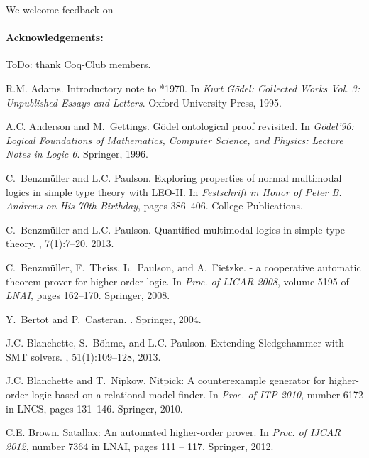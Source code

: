 \documentclass{llncs}
\begin{document}
We welcome feedback on 

\paragraph{Acknowledgements:} ToDo: thank Coq-Club members.


%
\begin{thebibliography}{10}

R.M. Adams.
\newblock Introductory note to *1970.
\newblock In {\em {Kurt G\"odel: Collected Works Vol. 3: Unpublished Essays and
  Letters}}. Oxford University Press, 1995.

A.C. Anderson and M.~Gettings.
\newblock G\"odel ontological proof revisited.
\newblock In {\em {G\"odel'96: Logical Foundations of Mathematics, Computer
  Science, and Physics: Lecture Notes in Logic 6}}. {Springer}, 1996.

C.~Benzm{\"u}ller and L.C. Paulson.
\newblock Exploring properties of normal multimodal logics in simple type
  theory with {LEO-II}.
\newblock In {\em {Festschrift in Honor of {Peter B. Andrews} on His 70th
  Birthday}}, pages 386--406. College Publications.

C.~Benzm{\"u}ller and L.C. Paulson.
\newblock Quantified multimodal logics in simple type theory.
,
  7(1):7--20, 2013.

C.~Benzm{\"u}ller, F.~Theiss, L.~Paulson, and A.~Fietzke.
 - a cooperative automatic theorem prover for higher-order
  logic.
\newblock In {\em Proc. of IJCAR 2008}, volume 5195 of {\em LNAI}, pages
  162--170. Springer, 2008.

Y.~Bertot and P.~Casteran.
.
\newblock Springer, 2004.

J.C. Blanchette, S.~B\"ohme, and L.C. Paulson.
\newblock Extending {Sledgehammer} with {SMT} solvers.
, 51(1):109--128, 2013.

J.C. Blanchette and T.~Nipkow.
\newblock Nitpick: A counterexample generator for higher-order logic based on a
  relational model finder.
\newblock In {\em Proc. of ITP 2010}, number 6172 in LNCS, pages 131--146.
  Springer, 2010.

C.E. Brown.
\newblock Satallax: An automated higher-order prover.
\newblock In {\em Proc. of IJCAR 2012}, number 7364 in LNAI, pages 111 -- 117.
  Springer, 2012.


\end{thebibliography}
\end{document}
